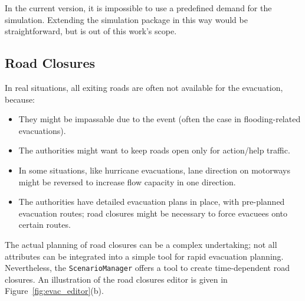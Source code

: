 In the current version, it is impossible to use a predefined demand for the simulation. Extending the simulation package in this way would be straightforward, but is out of this work's scope.

\subsection{Road Closures}
In real situations, all exiting roads are often not available for the evacuation, because:
\begin{itemize}\styleItemize
\item They might be impassable due to the event (often the case in flooding-related evacuations).
\item The authorities might want to keep roads open only for action/help traffic.
\item In some situations, like hurricane evacuations, lane direction on motorways might be reversed to increase flow capacity in one direction.
\item The authorities have detailed evacuation plans in place, with pre-planned evacuation routes; road closures might be necessary to force evacuees onto certain routes.
\end{itemize}
The actual planning of road closures can be a complex undertaking; not all attributes can be integrated into a simple tool for rapid evacuation planning. Nevertheless, the \lstinline|ScenarioManager| offers a tool to create time-dependent road closures. An illustration of the road closures editor is given in Figure~\ref{fig:evac_editor}(b).

